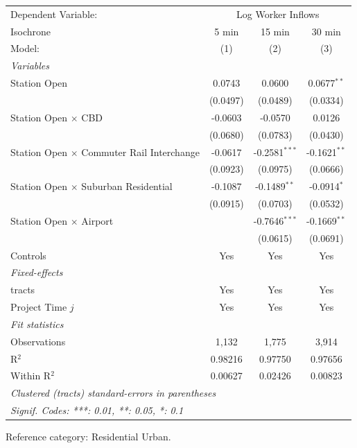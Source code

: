 
\begingroup
\centering
\begin{tabular}{lccc}
   \tabularnewline \midrule \midrule
   Dependent Variable: & \multicolumn{3}{c}{Log Worker Inflows}\\
   Isochrone                                        & 5 min    & 15 min          & 30 min \\   
   Model:                                           & (1)      & (2)             & (3)\\  
   \midrule
   \emph{Variables}\\
   Station Open                                     & 0.0743   & 0.0600          & 0.0677$^{**}$\\   
                                                    & (0.0497) & (0.0489)        & (0.0334)\\   
   Station Open $\times$ CBD                        & -0.0603  & -0.0570         & 0.0126\\   
                                                    & (0.0680) & (0.0783)        & (0.0430)\\   
   Station Open $\times$ Commuter Rail Interchange  & -0.0617  & -0.2581$^{***}$ & -0.1621$^{**}$\\   
                                                    & (0.0923) & (0.0975)        & (0.0666)\\   
   Station Open $\times$ Suburban Residential       & -0.1087  & -0.1489$^{**}$  & -0.0914$^{*}$\\   
                                                    & (0.0915) & (0.0703)        & (0.0532)\\   
   Station Open $\times$ Airport                    &          & -0.7646$^{***}$ & -0.1669$^{**}$\\   
                                                    &          & (0.0615)        & (0.0691)\\   
   Controls                                         & Yes      & Yes             & Yes\\  
   \midrule
   \emph{Fixed-effects}\\
   tracts                                           & Yes      & Yes             & Yes\\  
   Project Time $j$                                 & Yes      & Yes             & Yes\\  
   \midrule
   \emph{Fit statistics}\\
   Observations                                     & 1,132    & 1,775           & 3,914\\  
   R$^2$                                            & 0.98216  & 0.97750         & 0.97656\\  
   Within R$^2$                                     & 0.00627  & 0.02426         & 0.00823\\  
   \midrule \midrule
   \multicolumn{4}{l}{\emph{Clustered (tracts) standard-errors in parentheses}}\\
   \multicolumn{4}{l}{\emph{Signif. Codes: ***: 0.01, **: 0.05, *: 0.1}}\\
\end{tabular}
 
\par \raggedright 
Reference category: Residential Urban.
\par\endgroup


